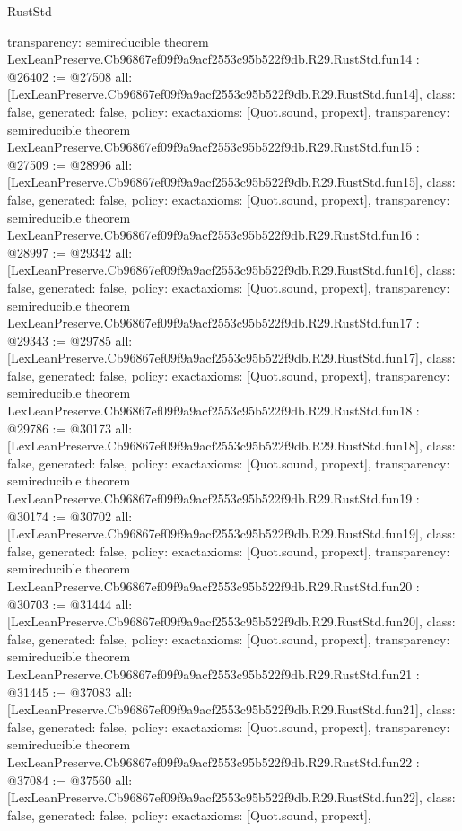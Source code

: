 \begin{lexlean}{RustStd}
\begin{coremodule}
{  transparency: semireducible
}
theorem LexLeanPreserve.Cb96867ef09f9a9acf2553c95b522f9db.R29.RustStd.fun14 : @26402 := @27508 {
  all: [LexLeanPreserve.Cb96867ef09f9a9acf2553c95b522f9db.R29.RustStd.fun14],
  class: false,
  generated: false,
  policy: exact{axioms: [Quot.sound, propext]},
  transparency: semireducible
}
theorem LexLeanPreserve.Cb96867ef09f9a9acf2553c95b522f9db.R29.RustStd.fun15 : @27509 := @28996 {
  all: [LexLeanPreserve.Cb96867ef09f9a9acf2553c95b522f9db.R29.RustStd.fun15],
  class: false,
  generated: false,
  policy: exact{axioms: [Quot.sound, propext]},
  transparency: semireducible
}
theorem LexLeanPreserve.Cb96867ef09f9a9acf2553c95b522f9db.R29.RustStd.fun16 : @28997 := @29342 {
  all: [LexLeanPreserve.Cb96867ef09f9a9acf2553c95b522f9db.R29.RustStd.fun16],
  class: false,
  generated: false,
  policy: exact{axioms: [Quot.sound, propext]},
  transparency: semireducible
}
theorem LexLeanPreserve.Cb96867ef09f9a9acf2553c95b522f9db.R29.RustStd.fun17 : @29343 := @29785 {
  all: [LexLeanPreserve.Cb96867ef09f9a9acf2553c95b522f9db.R29.RustStd.fun17],
  class: false,
  generated: false,
  policy: exact{axioms: [Quot.sound, propext]},
  transparency: semireducible
}
theorem LexLeanPreserve.Cb96867ef09f9a9acf2553c95b522f9db.R29.RustStd.fun18 : @29786 := @30173 {
  all: [LexLeanPreserve.Cb96867ef09f9a9acf2553c95b522f9db.R29.RustStd.fun18],
  class: false,
  generated: false,
  policy: exact{axioms: [Quot.sound, propext]},
  transparency: semireducible
}
theorem LexLeanPreserve.Cb96867ef09f9a9acf2553c95b522f9db.R29.RustStd.fun19 : @30174 := @30702 {
  all: [LexLeanPreserve.Cb96867ef09f9a9acf2553c95b522f9db.R29.RustStd.fun19],
  class: false,
  generated: false,
  policy: exact{axioms: [Quot.sound, propext]},
  transparency: semireducible
}
theorem LexLeanPreserve.Cb96867ef09f9a9acf2553c95b522f9db.R29.RustStd.fun20 : @30703 := @31444 {
  all: [LexLeanPreserve.Cb96867ef09f9a9acf2553c95b522f9db.R29.RustStd.fun20],
  class: false,
  generated: false,
  policy: exact{axioms: [Quot.sound, propext]},
  transparency: semireducible
}
theorem LexLeanPreserve.Cb96867ef09f9a9acf2553c95b522f9db.R29.RustStd.fun21 : @31445 := @37083 {
  all: [LexLeanPreserve.Cb96867ef09f9a9acf2553c95b522f9db.R29.RustStd.fun21],
  class: false,
  generated: false,
  policy: exact{axioms: [Quot.sound, propext]},
  transparency: semireducible
}
theorem LexLeanPreserve.Cb96867ef09f9a9acf2553c95b522f9db.R29.RustStd.fun22 : @37084 := @37560 {
  all: [LexLeanPreserve.Cb96867ef09f9a9acf2553c95b522f9db.R29.RustStd.fun22],
  class: false,
  generated: false,
  policy: exact{axioms: [Quot.sound, propext]},
}
\end{coremodule}
\end{lexlean}

